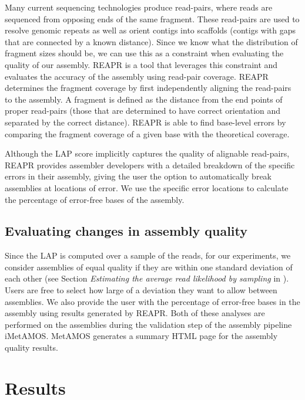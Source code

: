 \documentclass[12pt,\mydriver]{thesis}
\begin{document}
Many current sequencing technologies produce read-pairs, where reads are sequenced from opposing ends of the same fragment.
These read-pairs are used to resolve genomic repeats as well as orient contigs into scaffolds (contigs with gaps that are connected by a known distance).
Since we know what the distribution of fragment sizes should be, we can use this as a constraint when evaluating the quality of our assembly.
REAPR\cite{hunt2013reapr} is a tool that leverages this constraint and evaluates the accuracy of the assembly using read-pair coverage.
REAPR determines the fragment coverage by first independently aligning the read-pairs to the assembly.
A fragment is defined as the distance from the end points of proper read-pairs (those that are determined to have correct orientation and separated by the correct distance).
REAPR is able to find base-level errors by comparing the fragment coverage of a given base with the theoretical coverage.

Although the LAP score implicitly captures the quality of alignable read-pairs, REAPR provides assembler developers with a detailed breakdown of the specific errors in their assembly, giving the user the option to automatically break assemblies at locations of error.
We use the specific error locations to calculate the percentage of error-free bases of the assembly.








\subsection{Evaluating changes in assembly quality}
Since the LAP is computed over a sample of the reads, for our experiments, we consider assemblies of equal quality if they are within one standard deviation of each other (see Section \emph{Estimating the average read likelihood by sampling} in \cite{LAP}).
Users are free to select how large of a deviation they want to allow between assemblies.
We also provide the user with the percentage of error-free bases in the assembly using results generated by REAPR.
Both of these analyses are performed on the assemblies during the validation step of the assembly pipeline iMetAMOS\cite{koren2014automated, treangen2011metamos}.
MetAMOS generates a summary HTML page for the assembly quality results.

\section{Results}
\label{results}
\end{document}
